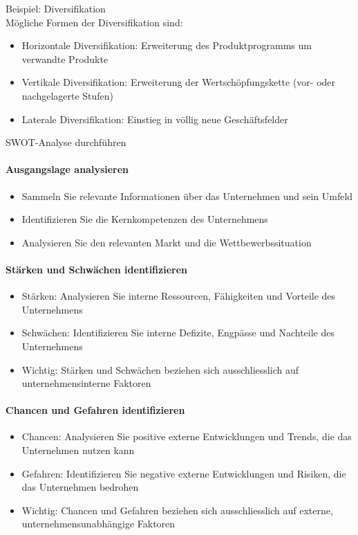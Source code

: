 \begin{example2}{Beispiel: Diversifikation}\\
Mögliche Formen der Diversifikation sind:
\begin{itemize}
    \item Horizontale Diversifikation: Erweiterung des Produktprogramms um verwandte Produkte
    \item Vertikale Diversifikation: Erweiterung der Wertschöpfungskette (vor- oder nachgelagerte Stufen)
    \item Laterale Diversifikation: Einstieg in völlig neue Geschäftsfelder
\end{itemize}
\end{example2}

\begin{KR}{SWOT-Analyse durchführen}\\
\paragraph{Ausgangslage analysieren}
\begin{itemize}
    \item Sammeln Sie relevante Informationen über das Unternehmen und sein Umfeld
    \item Identifizieren Sie die Kernkompetenzen des Unternehmens
    \item Analysieren Sie den relevanten Markt und die Wettbewerbssituation
\end{itemize}

\paragraph{Stärken und Schwächen identifizieren}
\begin{itemize}
    \item Stärken: Analysieren Sie interne Ressourcen, Fähigkeiten und Vorteile des Unternehmens
    \item Schwächen: Identifizieren Sie interne Defizite, Engpässe und Nachteile des Unternehmens
    \item Wichtig: Stärken und Schwächen beziehen sich ausschliesslich auf unternehmensinterne Faktoren
\end{itemize}

\paragraph{Chancen und Gefahren identifizieren}
\begin{itemize}
    \item Chancen: Analysieren Sie positive externe Entwicklungen und Trends, die das Unternehmen nutzen kann
    \item Gefahren: Identifizieren Sie negative externe Entwicklungen und Risiken, die das Unternehmen bedrohen
    \item Wichtig: Chancen und Gefahren beziehen sich ausschliesslich auf externe, unternehmensunabhängige Faktoren
\end{itemize}


\end{KR}
